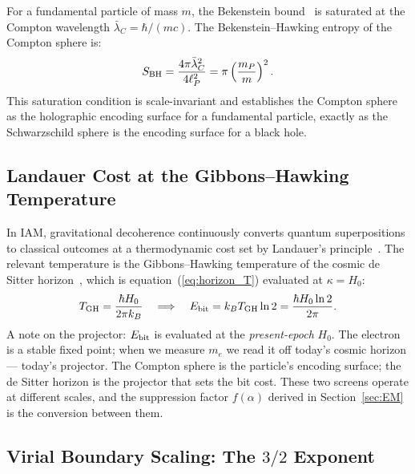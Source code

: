 \documentclass[12pt,a4paper]{article}
\begin{document}
For a fundamental particle of mass $m$, the Bekenstein
bound~\cite{bekenstein1973} is saturated at the Compton wavelength
$\bar\lambda_C = \hbar/(mc)$. The Bekenstein--Hawking entropy of the Compton
sphere is:
\begin{equation}
S_{\rm BH} = \frac{4\pi\bar\lambda_C^2}{4\ell_P^2} = \pi\left(\frac{m_P}{m}\right)^2.
\label{eq:bekenstein}
\end{equation}
This saturation condition is scale-invariant and establishes the Compton sphere
as the holographic encoding surface for a fundamental particle, exactly as the
Schwarzschild sphere is the encoding surface for a black hole.

\subsection{Landauer Cost at the Gibbons--Hawking Temperature}

In IAM, gravitational decoherence continuously converts quantum superpositions
to classical outcomes at a thermodynamic cost set by Landauer's
principle~\cite{landauer1961}. The relevant temperature is the
Gibbons--Hawking temperature of the cosmic de Sitter
horizon~\cite{gibbons1977}, which is equation~(\ref{eq:horizon_T}) evaluated
at $\kappa = H_0$:
\begin{equation}
T_{\rm GH} = \frac{\hbar H_0}{2\pi k_B}
\quad\Longrightarrow\quad
E_{\rm bit} = k_B T_{\rm GH} \ln 2 = \frac{\hbar H_0 \ln 2}{2\pi}.
\label{eq:ebit}
\end{equation}
A note on the projector: $E_{\rm bit}$ is evaluated at the \emph{present-epoch}
$H_0$. The electron is a stable fixed point; when we measure $m_e$ we read it
off today's cosmic horizon --- today's projector. The Compton sphere is the
particle's encoding surface; the de Sitter horizon is the projector that sets
the bit cost. These two screens operate at different scales, and the
suppression factor $f(\alpha)$ derived in Section~\ref{sec:EM} is the
conversion between them.

\subsection{Virial Boundary Scaling: The $3/2$ Exponent}
\end{document}
